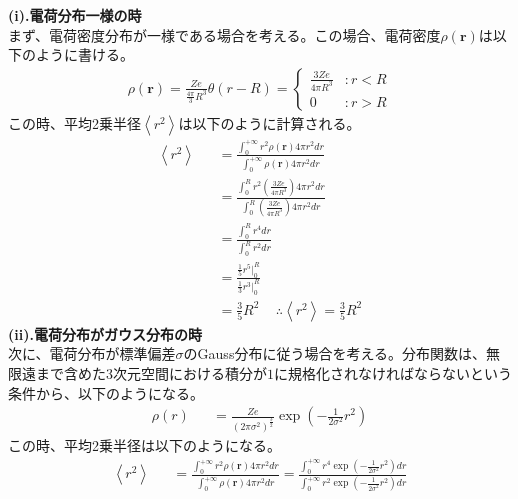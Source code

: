\documentclass[a4j,fleqn]{jsarticle}
\begin{document}
    \section{}
        \subsection{}
        \textbf{(i).電荷分布一様の時}\\
        まず、電荷密度分布が一様である場合を考える。この場合、電荷密度$\rho(\bm{r})$は以下のように書ける。
        \begin{eqnarray}
            \rho(\bm{r})=\frac{Ze}{\frac{4\pi}{3}R^3}\theta(r-R)=
            \begin{cases}
                \frac{3Ze}{4\pi{R^3}}&:r<R\\
                0&:r>R
            \end{cases}
        \end{eqnarray}
        この時、平均2乗半径$\left<r^2\right>$は以下のように計算される。
        \begin{eqnarray}
            \left<r^2\right>&&=\frac{\int_{0}^{+\infty}{r^2\rho(\bm{r})4\pi{r^2}dr}}{\int_{0}^{+\infty}{\rho(\bm{r})4\pi{r^2}dr}}\\
            &&=\frac{\int_{0}^{R}{r^2\left(\frac{3Ze}{4\pi{R^3}}\right)4\pi{r^2}dr}}{\int_{0}^{R}{\left(\frac{3Ze}{4\pi{R^3}}\right)4\pi{r^2}dr}}\\
            &&=\frac{\int_{0}^{R}{r^4dr}}{\int_{0}^{R}{r^2dr}}\\
            &&=\frac{\frac{1}{5}r^5\bigg|_{0}^{R}}{\frac{1}{3}r^3\bigg|_{0}^{R}}\\
            &&=\frac{3}{5}R^2\,\,\,\,\,\,\,\therefore\left<r^2\right>=\frac{3}{5}R^2
        \end{eqnarray}
        \textbf{(ii).電荷分布がガウス分布の時}\\
        次に、電荷分布が標準偏差$\sigma$のGauss分布に従う場合を考える。分布関数は、無限遠まで含めた3次元空間における積分が$1$に規格化されなければならないという条件から、以下のようになる。
        \begin{eqnarray}
            \rho\left(r\right)&&=\frac{Ze}{\left(2\pi\sigma^2\right)^{\frac{3}{2}}}\exp{\left(-\frac{1}{2\sigma^2}r^2\right)}
        \end{eqnarray}
        この時、平均2乗半径は以下のようになる。
        \begin{eqnarray}
            \left<r^2\right>&&=\frac{\int_{0}^{+\infty}{r^2\rho(\bm{r})4\pi{r^2}dr}}{\int_{0}^{+\infty}{\rho(\bm{r})4\pi{r^2}dr}}=\frac{\int_{0}^{+\infty}{r^4\exp{\left(-\frac{1}{2\sigma^2}r^2\right)}dr}}{\int_{0}^{+\infty}{{r^2}\exp{\left(-\frac{1}{2\sigma^2}r^2\right)}dr}}
        \end{eqnarray}
\end{document}

